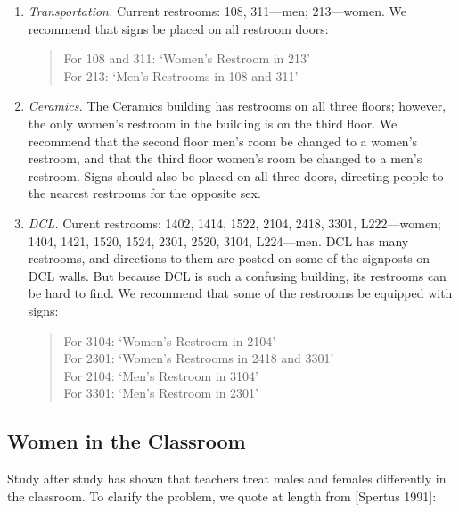 \begin{enumerate}
\item
{\em Transportation.}
Current restrooms:
108, 311---men;
213---women.
We recommend that signs be placed on all restroom doors:

\begin{quote}
For 108 and 311:  `Women's Restroom in 213' \\
For 213:  `Men's Restrooms in 108 and 311'
\end{quote}
 



\item
{\em Ceramics.}
The Ceramics building has restrooms on all three floors;
however,
the only women's restroom in the  building is on
the third floor.  We recommend that the second floor
men's room be changed to a women's restroom, and that the
third floor women's room be changed to a men's restroom.
Signs should also be placed on all three doors, directing
people to the nearest restrooms for the opposite sex.


\item 
{\em DCL.}
Curent restrooms:
1402, 1414, 1522, 2104, 2418, 3301, L222---women;
1404, 1421, 1520, 1524, 2301, 2520, 3104, L224---men.
DCL has many restrooms, and directions to them are
posted on some of the signposts on DCL walls.
But because DCL is such a confusing building,
its restrooms can be hard to find.
We recommend that some of the restrooms be equipped with signs:
\begin{quote}
For 3104:  `Women's Restroom in 2104' \\
For 2301:  `Women's Restrooms in 2418 and 3301' \\
For 2104:  `Men's Restroom in 3104'\\
For 3301:  `Men's Restroom in 2301'\\
\end{quote}


\end{enumerate}

\subsection{Women in the Classroom}

Study after study has shown that teachers treat males and females
differently in the classroom.
To clarify the problem, we quote at length from [Spertus 1991]:

